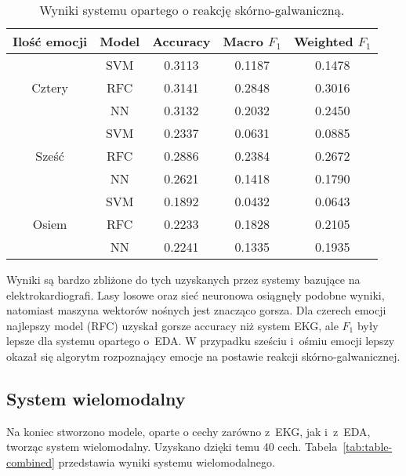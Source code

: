 \begin{table}[h]
    \centering
    \begin{tabular}{||c||c||c|c|c||}
        \hline
        Ilość emocji & Model & Accuracy & Macro \(F_{1}\) & Weighted \(F_{1}\) \\ [0.5ex]
        \hline\hline
        \multirow{3}{4em}{Cztery} & SVM & 0.3113 & 0.1187 & 0.1478 \\
        \cline{2-5}
        & RFC & 0.3141 & 0.2848 & 0.3016 \\
        \cline{2-5}
        & NN & 0.3132 & 0.2032 & 0.2450 \\
        \hline\hline
        \multirow{3}{4em}{Sześć} & SVM & 0.2337 & 0.0631 & 0.0885 \\
        \cline{2-5}
        & RFC & 0.2886 & 0.2384 & 0.2672 \\
        \cline{2-5}
        & NN & 0.2621 & 0.1418 & 0.1790 \\
        \hline\hline
        \multirow{3}{4em}{Osiem} & SVM & 0.1892 & 0.0432 & 0.0643 \\
        \cline{2-5}
        & RFC & 0.2233 & 0.1828 & 0.2105 \\
        \cline{2-5}
        & NN & 0.2241 & 0.1335 & 0.1935 \\
        \hline
    \end{tabular}
    \caption{Wyniki systemu opartego o reakcję skórno-galwaniczną.}
    \label{tab:table-eda}
\end{table}

Wyniki są bardzo zbliżone do tych uzyskanych przez systemy bazujące na elektrokardiografi.
Lasy losowe oraz sieć neuronowa osiągnęły podobne wyniki, natomiast maszyna wektorów nośnych jest znacząco gorsza.
Dla czerech emocji najlepszy model (RFC) uzyskał gorsze accuracy niż system EKG, ale \(F_{1}\) były lepsze dla systemu opartego o~EDA\@.
W przypadku sześciu i~ośmiu emocji lepszy okazał się algorytm rozpoznający emocje na postawie reakcji skórno-galwanicznej.

\subsection{System wielomodalny}\label{subsec:system-wielomodalny}

Na koniec stworzono modele, oparte o cechy zarówno z~EKG, jak i~z~EDA, tworząc system wielomodalny.
Uzyskano dzięki temu 40 cech.
Tabela~\ref{tab:table-combined} przedstawia wyniki systemu wielomodalnego.

